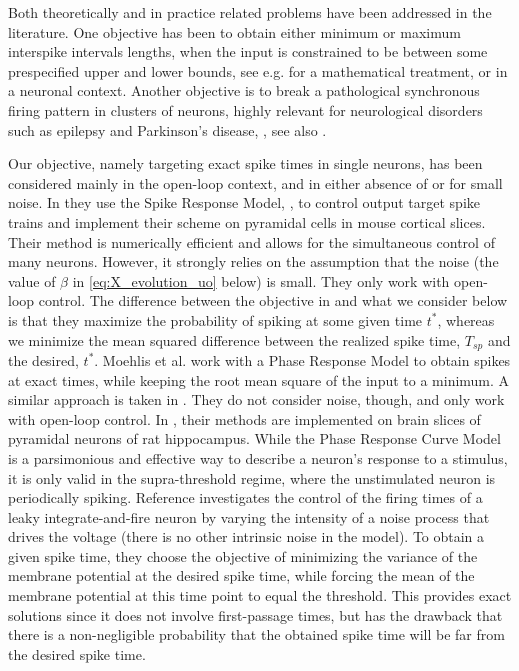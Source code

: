 Both theoretically and in practice related problems have been
addressed in the literature. One objective has been to
obtain either minimum or maximum interspike intervals lengths,
when the input is constrained to be between some prespecified upper
and lower bounds, see e.g. \cite{Lee1994,Lefebvre1987} for a
mathematical treatment, or \cite{Danzl2009,Nabi2012,Wu2009} in a neuronal
context. Another objective is to break a pathological synchronous
firing pattern in clusters of neurons, highly relevant for neurological
disorders such as epilepsy and Parkinson's disease,
\cite{Nabi2013a,Nabi2011}, see also \cite{Feng2007b}.

Our objective, namely targeting exact spike times in single neurons, has been
considered mainly in the open-loop context, and in either absence of or for
small noise. In \cite{Ahmadian2011} they use the Spike Response Model,
\cite{Gerstner2002}, to control output target spike trains and implement their
scheme on pyramidal cells in mouse cortical slices. Their method is numerically
efficient and allows for the simultaneous control of many neurons. However, it strongly relies on the assumption
that the noise (the value of $\beta$ in \cref{eq:X_evolution_uo} below) is small.
They only work with open-loop control.
The difference between the objective in \cite{Ahmadian2011} and what we consider
below is that they maximize the probability of spiking at some given time $t^*$, whereas we minimize the mean squared
difference between the realized spike time, $T_{sp}$ and the desired, $t^*$.
Moehlis et al. \cite{Moehlis2006} work with a Phase Response Model to obtain
spikes at exact times, while keeping the root mean square of the input to a
minimum. A similar approach is taken in \cite{Dasanayake2011}. They do not
consider noise, though, and only work with open-loop control. In
\cite{Nabi2013}, their methods are implemented on brain slices of pyramidal
neurons of rat hippocampus. While the
Phase Response Curve Model is a parsimonious and effective way to describe a
neuron's response to a stimulus, it is only valid in the supra-threshold regime,
where the unstimulated neuron is periodically spiking. Reference
\cite{Feng2003} investigates the control of the firing times of a
leaky integrate-and-fire neuron by varying the intensity of a noise process that
drives the voltage (there is no other intrinsic noise in the model). 
To obtain a given spike time, they choose the objective of minimizing the
variance of the membrane potential at the desired spike time, while forcing the
mean of the membrane potential at this time point to equal the threshold. This
provides exact solutions since it does not involve first-passage times, but has
the drawback that there is a non-negligible probability that the obtained spike
time will be far from the desired spike time.

